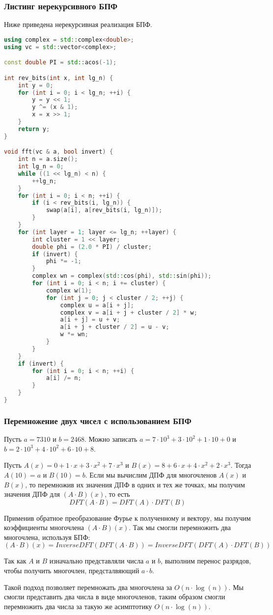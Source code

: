 \subsubsection*{Листинг нерекурсивного БПФ}
Ниже приведена нерекурсивная реализация БПФ.
\begin{lstlisting}[language=C++]
using complex = std::complex<double>;
using vc = std::vector<complex>;

const double PI = std::acos(-1);

int rev_bits(int x, int lg_n) {
    int y = 0;
    for (int i = 0; i < lg_n; ++i) {
        y = y << 1;
        y ^= (x & 1);
        x = x >> 1;
    }
    return y;
}

void fft(vc & a, bool invert) {
    int n = a.size();
    int lg_n = 0;
    while ((1 << lg_n) < n) {
        ++lg_n;
    }
    for (int i = 0; i < n; ++i) {
        if (i < rev_bits(i, lg_n)) {
            swap(a[i], a[rev_bits(i, lg_n)]);
        }
    }
    for (int layer = 1; layer <= lg_n; ++layer) {
        int cluster = 1 << layer;
        double phi = (2.0 * PI) / cluster;
        if (invert) {
            phi *= -1;
        }
        complex wn = complex(std::cos(phi), std::sin(phi));
        for (int i = 0; i < n; i += cluster) {
            complex w(1);
            for (int j = 0; j < cluster / 2; ++j) {
                complex u = a[i + j];
                complex v = a[i + j + cluster / 2] * w;
                a[i + j] = u + v;
                a[i + j + cluster / 2] = u - v;
                w *= wn;
            }
        }
    }
    if (invert) {
        for (int i = 0; i < n; ++i) {
            a[i] /= n;
        }
    }
}
\end{lstlisting}

\subsubsection*{Перемножение двух чисел с использованием БПФ}
Пусть $a = 7310$ и $b = 2468$. Можно записать $a = 7 \cdot 10 ^ 3 + 3 \cdot 10 ^ 2 + 1 \cdot 10 + 0$ и $b = 2 \cdot 10 ^ 3 + 4 \cdot 10 ^ 2 + 6 \cdot 10 + 8$.

Пусть $A(x) = 0 + 1 \cdot x + 3 \cdot x ^ 2 + 7 \cdot x ^ 3$ и $B(x) = 8 + 6 \cdot x + 4 \cdot x ^ 2 + 2 \cdot x ^ 3$. Тогда $A(10) = a$ и $B(10) = b$. Если мы вычислим ДПФ для многочленов $A(x)$ и $B(x)$, то перемножив их значения ДПФ в одних и тех же точках, мы получим значения ДПФ для $(A \cdot B) (x)$, то есть
$$DFT(A \cdot B) = DFT(A) \cdot DFT(B)$$

Применив обратное преобразование Фурье к полученному и вектору, мы получим коэффициенты многочлена $(A \cdot B) (x)$. Так мы смогли перемножить два многочлена, используя БПФ:
$$ (A \cdot B) (x) = InverseDFT(DFT(A \cdot B)) = InverseDFT(DFT(A) \cdot DFT(B)) $$

Так как $A$ и $B$ изначально представляли числа $a$ и $b$, выполним перенос разрядов, чтобы получить многочлен, предсталвяющий $a \cdot b$.

Такой подход позволяет перемножать два многочлена за $O(n \cdot \log(n))$. Мы смогли представить два числа в виде многочленов, таким образом смогли перемножить два числа за такую же асимптотику $O(n \cdot \log(n))$.

\pagebreak

